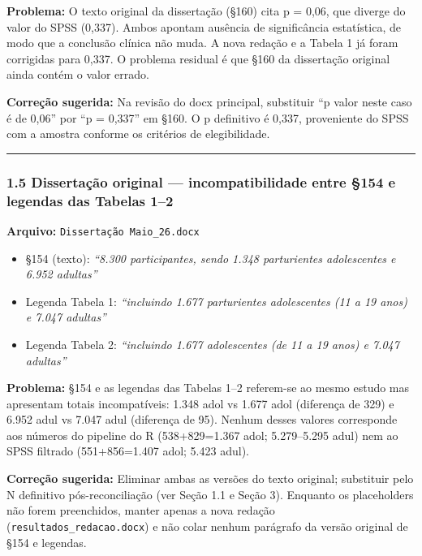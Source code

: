 \documentclass[
]{article}
\providecommand{\tightlist}{%
  \setlength{\itemsep}{0pt}\setlength{\parskip}{0pt}}
\begin{document}
\textbf{Problema:} O texto original da dissertação (§160) cita p = 0,06,
que diverge do valor do SPSS (0,337). Ambos apontam ausência de
significância estatística, de modo que a conclusão clínica não muda. A
nova redação e a Tabela 1 já foram corrigidas para 0,337. O problema
residual é que §160 da dissertação original ainda contém o valor errado.

\textbf{Correção sugerida:} Na revisão do docx principal, substituir ``p
valor neste caso é de 0,06'' por ``p = 0,337'' em §160. O p definitivo é
0,337, proveniente do SPSS com a amostra conforme os critérios de
elegibilidade.

\begin{center}\rule{0.5\linewidth}{0.5pt}\end{center}

\hypertarget{dissertauxe7uxe3o-original-incompatibilidade-entre-154-e-legendas-das-tabelas-12}{%
\subsubsection{1.5 Dissertação original --- incompatibilidade entre §154
e legendas das Tabelas
1--2}\label{dissertauxe7uxe3o-original-incompatibilidade-entre-154-e-legendas-das-tabelas-12}}

\textbf{Arquivo:} \texttt{Dissertação\ Maio\_26.docx}

\begin{itemize}
\tightlist
\item
  §154 (texto): \emph{``8.300 participantes, sendo 1.348 parturientes
  adolescentes e 6.952 adultas''}
\item
  Legenda Tabela 1: \emph{``incluindo 1.677 parturientes adolescentes
  (11 a 19 anos) e 7.047 adultas''}
\item
  Legenda Tabela 2: \emph{``incluindo 1.677 adolescentes (de 11 a 19
  anos) e 7.047 adultas''}
\end{itemize}

\textbf{Problema:} §154 e as legendas das Tabelas 1--2 referem-se ao
mesmo estudo mas apresentam totais incompatíveis: 1.348 adol vs 1.677
adol (diferença de 329) e 6.952 adul vs 7.047 adul (diferença de 95).
Nenhum desses valores corresponde aos números do pipeline do R
(538+829=1.367 adol; 5.279--5.295 adul) nem ao SPSS filtrado
(551+856=1.407 adol; 5.423 adul).

\textbf{Correção sugerida:} Eliminar ambas as versões do texto original;
substituir pelo N definitivo pós-reconciliação (ver Seção 1.1 e Seção
3). Enquanto os placeholders não forem preenchidos, manter apenas a nova
redação (\texttt{resultados\_redacao.docx}) e não colar nenhum parágrafo
da versão original de §154 e legendas.
\end{document}
